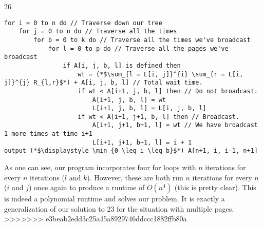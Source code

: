 \documentclass{article}
\begin{document}
\begin{prob} {26}
\begin{lstlisting}
for i = 0 to n do // Traverse down our tree
    for j = 0 to n do // Traverse all the times
        for b = 0 to k do // Traverse all the times we've broadcast
            for l = 0 to p do // Traverse all the pages we've broadcast
                if A[i, j, b, l] is defined then
                    wt = (*$\sum_{l = L[i, j]}^{i} \sum_{r = L[i, j]}^{j} R_{l,r}$*) + A[i, j, b, l] // Total wait time.
                    if wt < A[i+1, j, b, l] then // Do not broadcast.
                        A[i+1, j, b, l] = wt
                        L[i+1, j, b, l] = L[i, j, b, l]
                    if wt < A[i+1, j+1, b, l] then // Broadcast.
                        A[i+1, j+1, b+1, l] = wt // We have broadcast 1 more times at time i+1
                        L[i+1, j+1, b+1, l] = i + 1
output (*$\displaystyle \min_{0 \leq i \leq b}$*) A[n+1, i, i-1, n+1]
	\end{lstlisting}

	As one can see, our program incorporates four for loops with $n$ iterations for every $n$ iterations ($l$ and $k$).  However, these are both run $n$ iterations for every $n$ ($i$ and $j$) once again to produce a runtime of $O(n^4)$ (this is pretty clear). This is indeed a polynomial runtime and solves our problem. It is exactly a generalization of our solution to 23 for the situation with multiple pages. 
>>>>>>> e3beab2edd3c25a45a8929746ddccc1882ffb80a

\end{prob}
\end{document}
